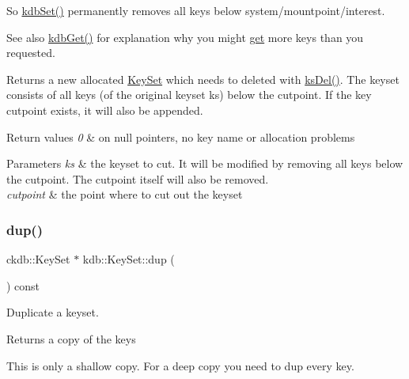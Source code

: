 So \hyperlink{group__kdb_ga11436b058408f83d303ca5e996832bcf}{kdb\+Set()} permanently removes all keys below {\ttfamily system/mountpoint/interest}.

\begin{DoxySeeAlso}{See also}
\hyperlink{group__kdb_ga28e385fd9cb7ccfe0b2f1ed2f62453a1}{kdb\+Get()} for explanation why you might \hyperlink{classkdb_1_1KeySet_a65208974b44da0162ef70dd7a173748f}{get} more keys than you requested.
\end{DoxySeeAlso}
\begin{DoxyReturn}{Returns}
a new allocated \hyperlink{classkdb_1_1KeySet}{Key\+Set} which needs to deleted with \hyperlink{group__keyset_ga27e5c16473b02a422238c8d970db7ac8}{ks\+Del()}. The keyset consists of all keys (of the original keyset ks) below the cutpoint. If the key cutpoint exists, it will also be appended. 
\end{DoxyReturn}

\begin{DoxyRetVals}{Return values}
{\em 0} & on null pointers, no key name or allocation problems \\
\hline
\end{DoxyRetVals}

\begin{DoxyParams}{Parameters}
{\em ks} & the keyset to cut. It will be modified by removing all keys below the cutpoint. The cutpoint itself will also be removed. \\
\hline
{\em cutpoint} & the point where to cut out the keyset \\
\hline
\end{DoxyParams}
\mbox{\label{classkdb_1_1KeySet_ad3f2b936d66729690e8a8a45b5074baa}} 
\subsubsection{\texorpdfstring{dup()}{dup()}}
{\footnotesize\ttfamily ckdb\+::\+Key\+Set $\ast$ kdb\+::\+Key\+Set\+::dup (\begin{DoxyParamCaption}{ }\end{DoxyParamCaption}) const\hspace{0.3cm}{\ttfamily [inline]}}



Duplicate a keyset. 

\begin{DoxyReturn}{Returns}
a copy of the keys
\end{DoxyReturn}
This is only a shallow copy. For a deep copy you need to dup every key.

